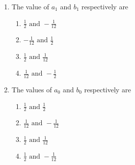 \documentclass[journal]{IEEEtran}
\begin{document}
\begin{enumerate}[start=40]
\begin{multicols}{4}
\begin{enumerate}
        \item an empty set 
        \item a singleton set  
        \item P 
        \item X 
    \end{enumerate}
\end{multicols}
\bigskip
$$\textbf{Linked Answer Question}$$
$\textbf{Statement for linked Answer Questions 52 and 53:}$\\
For a differentiable function f$\brak{x},$ the integral $\int_{0}^{h}f\brak{x}dx$ is approximated by the formula $h\sbrak{a_{0}f\brak{0}+a_{1}f\brak{h}}+h^{2}\sbrak{b_{0}f^{\prime}\brak{0}+b_{1}f^{\prime}\brak{h}},$ which is exact for all polynomials of degree at most 3.\bigskip
\item The value of $a_{1}$ and $b_{1}$ respectively are 
\begin{multicols}{4}
    \begin{enumerate}
        \item $\frac{1}{2} \text{ and } -\frac{1}{12}$
        \item $-\frac{1}{12} \text{ and } \frac{1}{2}$ 
        \item$\frac{1}{2} \text{ and } \frac{1}{12}$
        \item$\frac{1}{12} \text{ and } -\frac{1}{2}$
    \end{enumerate}
\end{multicols}
\bigskip
\item The values of $a_{0}$ and $b_{0}$ respectively  are 
\begin{multicols}{4}
    \begin{enumerate}
        \item $\frac{1}{2} \text{ and } \frac{1}{2}$
        \item $\frac{1}{12} \text{ and } -\frac{1}{12}$ 
        \item$\frac{1}{2} \text{ and } \frac{1}{12}$
        \item$\frac{1}{2} \text{ and } -\frac{1}{12}$
    \end{enumerate}
\end{multicols}



\end{enumerate}
\end{document}
